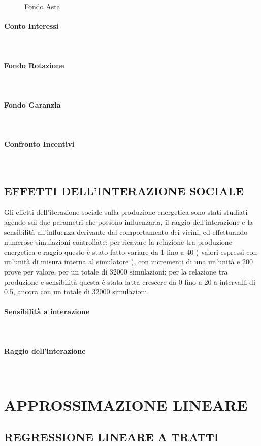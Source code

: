 \documentclass[12pt,a4paper,openright,twoside]{report}
\newcommand{\myparagraph}[1]{\paragraph{#1}\mbox{}\\}
\begin{document}
\begin{figure}[H]
	\centering
	\qquad
	\caption{Fondo Asta}
	\label{graphSimA}
\end{figure}


\myparagraph{Conto Interessi}

\myparagraph{Fondo Rotazione}

\myparagraph{Fondo Garanzia}

\myparagraph{Confronto Incentivi}

\subsection{EFFETTI DELL'INTERAZIONE SOCIALE}

Gli effetti dell'iterazione sociale sulla produzione energetica sono stati studiati agendo sui due parametri che possono influenzarla, il raggio dell'interazione e la sensibilità all'influenza derivante dal comportamento dei vicini, ed effettuando numerose simulazioni controllate: per ricavare la relazione tra produzione energetica e raggio questo è stato fatto variare da 1 fino a 40 ( valori espressi con un'unità di misura interna al simulatore ), con incrementi di una un'unità e 200 prove per valore, per un totale di 32000 simulazioni; per la relazione tra produzione e sensibilità questa è stata fatta crescere da 0 fino a 20 a intervalli di 0.5, ancora con un totale di 32000 simulazioni.

\myparagraph{Sensibilità a interazione}

\myparagraph{Raggio dell'interazione}


\section[APPROSSIMAZIONE LINEARE]{APPROSSIMAZIONE LINEARE}

\subsection{REGRESSIONE LINEARE A TRATTI}


\nocite{*}


\end{document}
